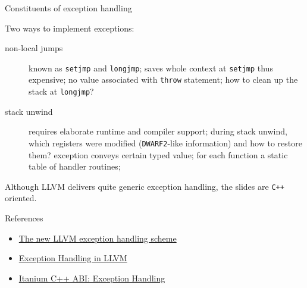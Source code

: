 \documentclass[8pt]{beamer}
\begin{document}
\begin{frame}[fragile]{Constituents of exception handling}
  \begin{block}{Two ways to implement exceptions:}
    \begin{description}
      \item[non-local jumps] known as \texttt{setjmp} and \texttt{longjmp};
        saves whole context at \texttt{setjmp} thus expensive; no value
        associated with \texttt{throw} statement; how to clean up the stack at
        \texttt{longjmp}?
      \item[stack unwind] requires elaborate runtime and compiler support;
        during stack unwind, which registers were modified
        (\texttt{DWARF2}-like information) and how to restore them? exception
        conveys certain typed value; for each function a static table of
        handler routines;
    \end{description}
  \end{block}

  \begin{alertblock}{}
    Although LLVM delivers quite generic exception handling, the slides are
    \verb|C++| oriented.
  \end{alertblock}

  \begin{exampleblock}{References}
    \begin{itemize}
      \item
        \href{http://llvm.org/devmtg/2011-09-16/EuroLLVM2011-ExceptionHandling.pdf}{The
          new LLVM exception handling scheme}
      \item \href{http://llvm.org/docs/ExceptionHandling.html}{Exception Handling
          in LLVM}
      \item \href{http://mentorembedded.github.com/cxx-abi/abi-eh.html}{Itanium
          C++ ABI: Exception Handling}
    \end{itemize}
  \end{exampleblock}
\end{frame}
\end{document}

